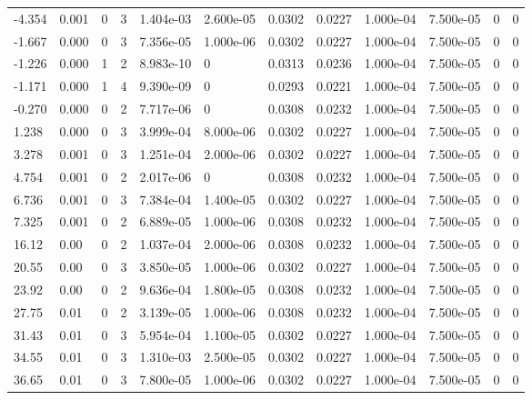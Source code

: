 \documentclass[preview]{standalone}
\begin{document}
{{\begin{tabular}{L{1.2cm}C{1.2cm} C{0.3cm}C{0.5cm} C{1.4cm}C{1.4cm} C{1.4cm}C{1.4cm} C{1.6cm}C{1.6cm} C{1.6cm}C{1.6cm}}
  -4.354  &  0.001  & 0     &  3 &  1.404e-03  & 2.600e-05  &  0.0302&   0.0227& 1.000e-04 & 7.500e-05   &  0 & 0  \\ 
  -1.667  &  0.000  & 0     &  3 &  7.356e-05  & 1.000e-06  &  0.0302&   0.0227& 1.000e-04 & 7.500e-05   &  0 & 0  \\ 
  -1.226  &  0.000  & 1     &  2 &  8.983e-10  & 0  &  0.0313&   0.0236& 1.000e-04 & 7.500e-05   &  0 & 0  \\ 
  -1.171  &  0.000  & 1     &  4 &  9.390e-09  & 0  &  0.0293&   0.0221& 1.000e-04 & 7.500e-05   &  0 & 0  \\ 
  -0.270  &  0.000  & 0     &  2 &  7.717e-06  & 0  &  0.0308&   0.0232& 1.000e-04 & 7.500e-05   &  0 & 0  \\ 
  1.238  &  0.000  & 0     &  3 &  3.999e-04  & 8.000e-06  &  0.0302&   0.0227& 1.000e-04 & 7.500e-05   &  0 & 0  \\ 
  3.278  &  0.001  & 0     &  3 &  1.251e-04  & 2.000e-06  &  0.0302&   0.0227& 1.000e-04 & 7.500e-05   &  0 & 0  \\ 
  4.754  &  0.001  & 0     &  2 &  2.017e-06  & 0  &  0.0308&   0.0232& 1.000e-04 & 7.500e-05   &  0 & 0  \\ 
  6.736  &  0.001  & 0     &  3 &  7.384e-04  & 1.400e-05  &  0.0302&   0.0227& 1.000e-04 & 7.500e-05   &  0 & 0  \\ 
  7.325  &  0.001  & 0     &  2 &  6.889e-05  & 1.000e-06  &  0.0308&   0.0232& 1.000e-04 & 7.500e-05   &  0 & 0  \\ 
  16.12  &  0.00  & 0     &  2 &  1.037e-04  & 2.000e-06  &  0.0308&   0.0232& 1.000e-04 & 7.500e-05   &  0 & 0  \\ 
  20.55  &  0.00  & 0     &  3 &  3.850e-05  & 1.000e-06  &  0.0302&   0.0227& 1.000e-04 & 7.500e-05   &  0 & 0  \\ 
  23.92  &  0.00  & 0     &  2 &  9.636e-04  & 1.800e-05  &  0.0308&   0.0232& 1.000e-04 & 7.500e-05   &  0 & 0  \\ 
  27.75  &  0.01  & 0     &  2 &  3.139e-05  & 1.000e-06  &  0.0308&   0.0232& 1.000e-04 & 7.500e-05   &  0 & 0  \\ 
  31.43  &  0.01  & 0     &  3 &  5.954e-04  & 1.100e-05  &  0.0302&   0.0227& 1.000e-04 & 7.500e-05   &  0 & 0  \\ 
  34.55  &  0.01  & 0     &  3 &  1.310e-03  & 2.500e-05  &  0.0302&   0.0227& 1.000e-04 & 7.500e-05   &  0 & 0  \\ 
  36.65  &  0.01  & 0     &  3 &  7.800e-05  & 1.000e-06  &  0.0302&   0.0227& 1.000e-04 & 7.500e-05   &  0 & 0  \\ 

\end{tabular}}}
\end{document}
